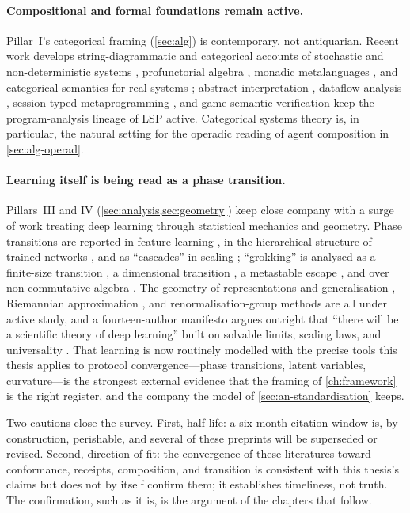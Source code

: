 \paragraph{Compositional and formal foundations remain active.} Pillar~I's
categorical framing (\cref{sec:alg}) is contemporary, not antiquarian. Recent work
develops string-diagrammatic and categorical accounts of stochastic and
non-deterministic systems \citep{bonchi26, lynch26}, profunctorial algebra
\citep{aristote26}, monadic metalanguages \citep{liellcock25}, and categorical
semantics for real systems \citep{carlisle26}; abstract interpretation
\citep{lueker25}, dataflow analysis \citep{brahmakshatriya26}, session-typed
metaprogramming \citep{angelo26}, and game-semantic verification
\citep{koutavas25} keep the program-analysis lineage of LSP active. Categorical
systems theory \citep{lynch26} is, in particular, the natural setting for the
operadic reading of agent composition in \cref{sec:alg-operad}.

\paragraph{Learning itself is being read as a phase transition.} Pillars~III and
IV (\cref{sec:analysis,sec:geometry}) keep close company with a surge of work
treating deep learning through statistical mechanics and geometry. Phase
transitions are reported in feature learning \citep{montanari26}, in the
hierarchical structure of trained networks \citep{ersoy25}, and as ``cascades''
in scaling \citep{defilippis26}; ``grokking'' is analysed as a finite-size
transition \citep{bi26grok}, a dimensional transition \citep{wang26grok}, a
metastable escape \citep{ersoy26}, and over non-commutative algebra
\citep{notsawo26}. The geometry of representations and generalisation
\citep{yadav26}, Riemannian approximation \citep{david25}, and
renormalisation-group methods \citep{tan26rg} are all under active study, and a
fourteen-author manifesto argues outright that ``there will be a scientific theory
of deep learning'' built on solvable limits, scaling laws, and universality
\citep{simon26}. That learning is now routinely modelled with the precise tools
this thesis applies to protocol convergence---phase transitions, latent variables,
curvature---is the strongest external evidence that the framing of
\cref{ch:framework} is the right register, and the company the model of
\cref{sec:an-standardisation} keeps.

\medskip
\noindent Two cautions close the survey. First, half-life: a six-month citation
window is, by construction, perishable, and several of these preprints will be
superseded or revised. Second, direction of fit: the convergence of these
literatures toward conformance, receipts, composition, and transition is
consistent with this thesis's claims but does not by itself confirm them; it
establishes timeliness, not truth. The confirmation, such as it is, is the
argument of the chapters that follow.
